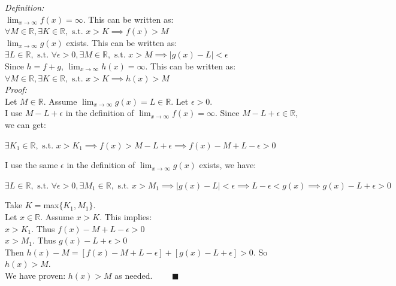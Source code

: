\documentclass[12pt]{exam}
\newcommand {\DS} [1] {${\displaystyle #1}$}
\newcommand{\vv}{\vspace{.2cm}}
\newcommand{\R}{\mathbb{R}}
\begin{document}
\begin{enumerate}
	\emph{Definition:}\\
	\DS{\lim_{x \to \infty} f(x)=\infty}. This can be written as: $\forall M \in \R, \exists K\in \R, \mbox{ s.t. } x > K \implies f(x) > M$
	\\
	\DS{\lim_{x \to \infty} g(x)} exists. This can be written as: $\exists L\in \R, \mbox{ s.t. } \forall \epsilon >0, \exists M\in \R, \mbox{ s.t. } x > M \implies \vert{g(x)-L}\vert < \epsilon$
	\\
	Since $h=f+g$,
	\DS{\lim_{x \to \infty} h(x)=\infty}. This can be written as: $\forall M \in \R, \exists K\in \R, \mbox{ s.t. } x > K \implies h(x) > M$
	\\
	\emph{Proof:}\\
    	Let $M\in\R.$ Assume \DS{\lim_{x \to \infty} g(x)=L}$\in\R.$ Let $\epsilon>0.$
    	\\
    	I use $M-L+\epsilon$ in the definition of \DS{\lim_{x \to \infty} f(x)=\infty}. Since $M-L+\epsilon\in\R$, we can get:

    	\vv

    	$\exists K_1\in \R, \mbox{ s.t. } x > K_1 \implies f(x) > M-L+\epsilon \implies f(x)-M+L-\epsilon > 0$

    	\vv

    	I use the same $\epsilon$ in the definition of \DS{\lim_{x \to \infty} g(x)} exists, we have:

    	\vv

    	$\exists L\in \R, \mbox{ s.t. } \forall \epsilon >0, \exists M_1\in \R, \mbox{ s.t. } x > M_1 \implies \vert{g(x)-L}\vert< \epsilon \implies L-\epsilon<g(x) \implies g(x)-L+\epsilon>0$

    	\vv

    	Take $K=$max$\{K_1, M_1\}.$\\
    	Let $x\in\R.$ Assume $x>K$. This implies:\\
    	$x>K_1.$ Thus $f(x)-M+L-\epsilon>0$\\
    	$x>M_1.$ Thus $g(x)-L+\epsilon>0$\\
    	Then $h(x)-M=[f(x)-M+L-\epsilon]+[g(x)-L+\epsilon]>0.$
	So $h(x) > M.$
    	\\
    	We have proven: $h(x) > M$ as needed. $\quad \quad \blacksquare$

\end{enumerate}
\end{document}
